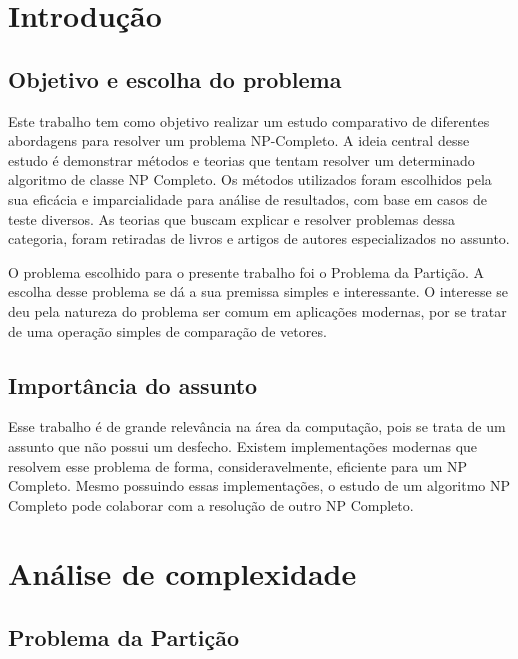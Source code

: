\documentclass{article}
\begin{document}


\newpage
\thispagestyle{empty}
\tableofcontents

\newpage
\large %

\section{Introdução}

\subsection{Objetivo e escolha do problema}

Este trabalho tem como objetivo realizar um estudo comparativo de diferentes abordagens para resolver um problema NP-Completo. A ideia central desse estudo é demonstrar métodos e teorias que tentam resolver um determinado algoritmo de classe NP Completo. Os métodos utilizados foram escolhidos pela sua eficácia e imparcialidade para análise de resultados, com base em casos de teste diversos. As teorias que buscam explicar e resolver problemas dessa categoria, foram retiradas de livros e artigos de autores especializados no assunto.

O problema escolhido para o presente trabalho foi o Problema da Partição. A escolha desse problema se dá a sua premissa simples e interessante. O interesse se deu pela natureza do problema ser comum em aplicações modernas, por se tratar de uma operação simples de comparação de vetores.

\subsection{Importância do assunto}

Esse trabalho é de grande relevância na área da computação, pois se trata de um assunto que não possui um desfecho. Existem implementações modernas que resolvem esse problema de forma, consideravelmente, eficiente para um NP Completo. Mesmo possuindo essas implementações, o estudo de um algoritmo NP Completo pode colaborar com a resolução de outro NP Completo.

\section{Análise de complexidade}

\subsection{Problema da Partição}
\end{document}
